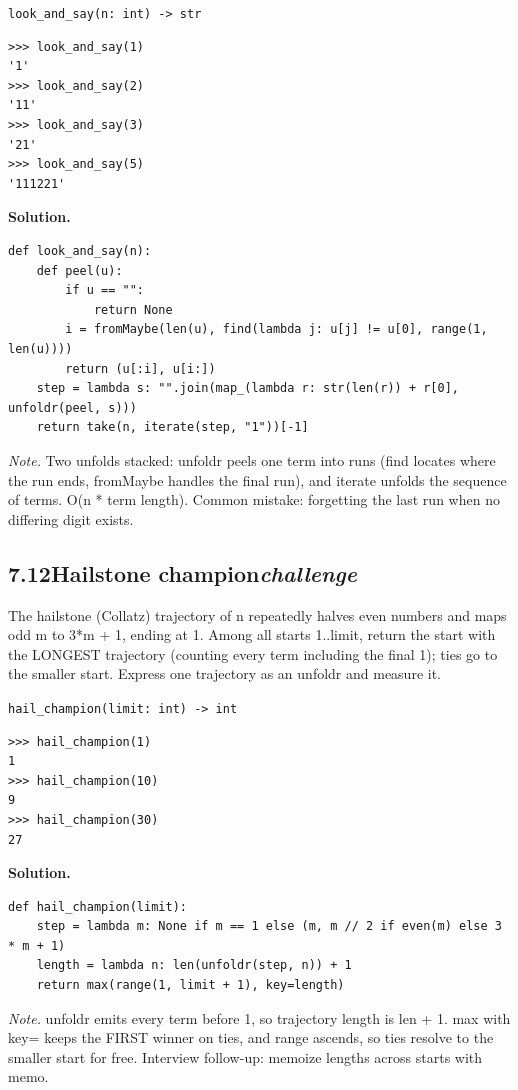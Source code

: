 \documentclass[10pt,letterpaper]{book}
\begin{document}
\noindent\texttt{look\_and\_say(n: int) -> str}
\begin{lstlisting}[style=ex]
>>> look_and_say(1)
'1'
>>> look_and_say(2)
'11'
>>> look_and_say(3)
'21'
>>> look_and_say(5)
'111221'
\end{lstlisting}
\noindent\textbf{Solution.}
\begin{lstlisting}[style=code]
def look_and_say(n):
    def peel(u):
        if u == "":
            return None
        i = fromMaybe(len(u), find(lambda j: u[j] != u[0], range(1, len(u))))
        return (u[:i], u[i:])
    step = lambda s: "".join(map_(lambda r: str(len(r)) + r[0], unfoldr(peel, s)))
    return take(n, iterate(step, "1"))[-1]
\end{lstlisting}
\noindent\textit{Note.} Two unfolds stacked: unfoldr peels one term into runs (find locates where the run ends, fromMaybe handles the final run), and iterate unfolds the sequence of terms. O(n * term length). Common mistake: forgetting the last run when no differing digit exists.


\subsection*{7.12\quad Hailstone champion\hfill\textnormal{\textit{challenge}}}
The hailstone (Collatz) trajectory of n repeatedly halves even numbers and maps odd m to 3*m + 1, ending at 1. Among all starts 1..limit, return the start with the LONGEST trajectory (counting every term including the final 1); ties go to the smaller start. Express one trajectory as an unfoldr and measure it.

\noindent\texttt{hail\_champion(limit: int) -> int}
\begin{lstlisting}[style=ex]
>>> hail_champion(1)
1
>>> hail_champion(10)
9
>>> hail_champion(30)
27
\end{lstlisting}
\noindent\textbf{Solution.}
\begin{lstlisting}[style=code]
def hail_champion(limit):
    step = lambda m: None if m == 1 else (m, m // 2 if even(m) else 3 * m + 1)
    length = lambda n: len(unfoldr(step, n)) + 1
    return max(range(1, limit + 1), key=length)
\end{lstlisting}
\noindent\textit{Note.} unfoldr emits every term before 1, so trajectory length is len + 1. max with key= keeps the FIRST winner on ties, and range ascends, so ties resolve to the smaller start for free. Interview follow-up: memoize lengths across starts with memo.
\end{document}
